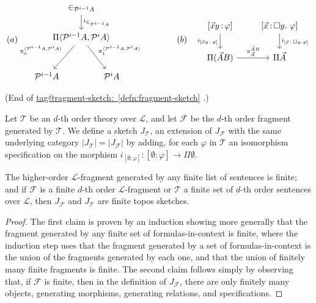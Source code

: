 \documentclass{amsart}
\makeatletter
\newcommand\abs[2][]{#1\lvert{#2}#1\rvert}
\newcommand\br[1]{\langle{}#1\rangle{}}
\newcommand\cF{\mathcal{F}}
\newcommand\cL{\mathcal{L}}
\newcommand\cT{\mathcal{T}}
\renewcommand\phi{\varphi}
\newcommand\pow{\mathcal{P}}
\newcommand\tolon{{\,:\,}}
\newcommand\vA{\vek{A}}
\newcommand\vek[1]{{\vec{#1}}}
\newcommand\vx{\vek{x}}
\newcommand\tagword[1]{\csname tag@#1\endcsname}
\def\label@tag#1:#2\@nil{#1}
\newcommand\labeltag[1]{\label@tag#1:\@nil}
\newcommand\jref[1]{%
  \texorpdfstring%
    {\hyperref[#1]{\tagword{\labeltag{#1}}~\ref*{#1}}}%
    {\tagword{\labeltag{#1}}~\ref*{#1}}%
}
\theoremstyle{definition}
\theoremstyle{remark}
\theoremstyle{plainwithref}
\makeatother
\begin{document}
\begin{defn}
  \begin{equation} \label{eq:frag-sketch-spec-diags}
    (a)
    \begin{tikzcd}
      &[-40pt] \in_{\pow^{i-1} A} \ar[d, "i_{\in_{\pow^{i-1} A}}"] &[-40pt] \\
      & \Pi \br{\pow^{i-1} A, \pow^{i} A} \ar[ld, "\pi_0^{\br{\pow^{i-1} A, \pow^{i} A}}"'] \ar[rd, "\pi_1^{\br{\pow^{i-1} A, \pow^{i} A}}"] & \\[10pt]
      \pow^{i-1} A & & \pow^{i} A
    \end{tikzcd}
    \qquad\qquad
    (b) \quad
    \begin{tikzcd}
      {[\vx y \tolon \phi]} \ar[d, "i_{[\vx y \tolon \phi]}"'] &
      {[\vx \tolon \square y.\ \phi]} \ar[d, "i_{[\vx \tolon \square y. \phi]}"] \\
      \Pi (\vA B) \ar[r, "\pi_{\vA}^{\vA B}"] & \Pi \vA
    \end{tikzcd}
  \end{equation}

  \noindent
  (End of \jref{defn:fragment-sketch}.)
\end{defn}

\begin{defn} \label{defn:thy-sketch}
  Let \( \cT \) be an \( d \)-th order theory over \( \cL \), and let \( \cF \) be the \( d \)-th order fragment generated by \( \cT \).
  We define a sketch \( J_\cT \), an extension of \( J_\cF \) with the same underlying category \( \abs{J_\cT} = \abs{J_\cF} \) by adding, for each \( \phi \) in \( \cT \) an isomorphism specification on the morphism \( i_{[\emptyset \colon \phi]} \colon [\emptyset \colon \phi] \to \Pi \emptyset \).
\end{defn}

\begin{lem} \label{lem:finite-thy-finite-sketch}
  The higher-order \( \cL \)-fragment generated by any finite list of sentences is finite; and if \( \cF \) is a finite \( d \)-th order \( \cL \)-fragment or \( \cT \) a finite set of \( d \)-th order sentences over \( \cL \), then \( J_{\cF} \) and \( J_{\cT} \) are finite topos sketches.
\end{lem}
\begin{proof}
  The first claim is proven by an induction showing more generally that the fragment generated by any finite set of formulas-in-context is finite, where the induction step uses that the fragment generated by a set of formulas-in-context is the union of the fragments generated by each one, and that the union of finitely many finite fragments is finite.
  The second claim follows simply by observing that, if \( \cF \) is finite, then in the definition of \( J_{\cF} \), there are only finitely many objects, generating morphisms, generating relations, and specifications.
\end{proof}
\end{document}

